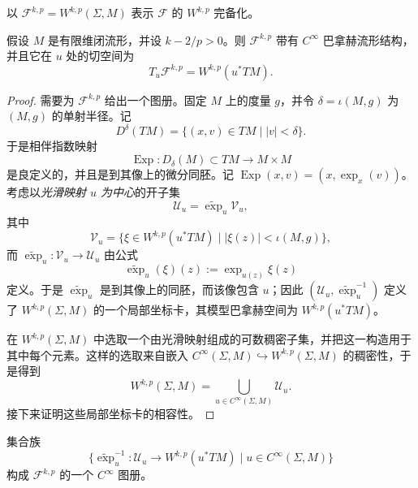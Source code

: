 以 $\mathcal F^{k,p}=W^{k,p}(\Sigma,M)$ 表示 $\mathcal F$ 的 $W^{k,p}$ 完备化。

\begin{proposition}\label{prop:sobolev-mapping-space-banach-manifold}
假设 $M$ 是有限维闭流形，并设 $k-2/p>0$。则
$\mathcal F^{k,p}$ 带有 $C^\infty$ 巴拿赫流形结构，并且它在 $u$ 处的切空间为
\begin{equation}
 T_u\mathcal F^{k,p}=W^{k,p}(u^*TM).
 \label{eq:tangent-sobolev-mapping-space}
\end{equation}
\end{proposition}

\begin{proof}
需要为 $\mathcal F^{k,p}$ 给出一个图册。固定 $M$ 上的度量 $g$，并令
$\delta=\iota(M,g)$ 为 $(M,g)$ 的单射半径。记
\[
 D^\delta(TM)=\{(x,v)\in TM\mid |v|<\delta\}.
\]
于是相伴指数映射
\[
 \operatorname{Exp}:D_\delta(M)\subset TM\longrightarrow M\times M
\]
是良定义的，并且是到其像上的微分同胚。记
$\operatorname{Exp}(x,v)=(x,\exp_x(v))$。考虑以\emph{光滑映射 $u$ 为中心}的开子集
\[
 \mathcal U_u=\widetilde{\exp}_u\mathcal V_u,
\]
其中
\[
 \mathcal V_u=
 \{\xi\in W^{k,p}(u^*TM)\mid |\xi(z)|<\iota(M,g)\},
\]
而 $\widetilde{\exp}_u:\mathcal V_u\to\mathcal U_u$ 由公式
\[
 \widetilde{\exp}_u(\xi)(z):=\exp_{u(z)}\xi(z)
\]
定义。于是 $\widetilde{\exp}_u$ 是到其像上的同胚，而该像包含 $u$；因此
$(\mathcal U_u,\widetilde{\exp}_u^{-1})$ 定义了
$W^{k,p}(\Sigma,M)$ 的一个局部坐标卡，其模型巴拿赫空间为
$W^{k,p}(u^*TM)$。

在 $W^{k,p}(\Sigma,M)$ 中选取一个由光滑映射组成的可数稠密子集，并把这一构造用于其中每个元素。这样的选取来自嵌入
$C^\infty(\Sigma,M)\hookrightarrow W^{k,p}(\Sigma,M)$ 的稠密性，于是得到
\[
 W^{k,p}(\Sigma,M)=
 \bigcup_{u\in C^\infty(\Sigma,M)}\mathcal U_u.
\]
接下来证明这些局部坐标卡的相容性。
\end{proof}

\begin{lemma}\label{lem:exponential-charts-smooth-atlas}
集合族
\[
 \{\widetilde{\exp}_u^{-1}:\mathcal U_u\to W^{k,p}(u^*TM)
 \mid u\in C^\infty(\Sigma,M)\}
\]
构成 $\mathcal F^{k,p}$ 的一个 $C^\infty$ 图册。
\end{lemma}

